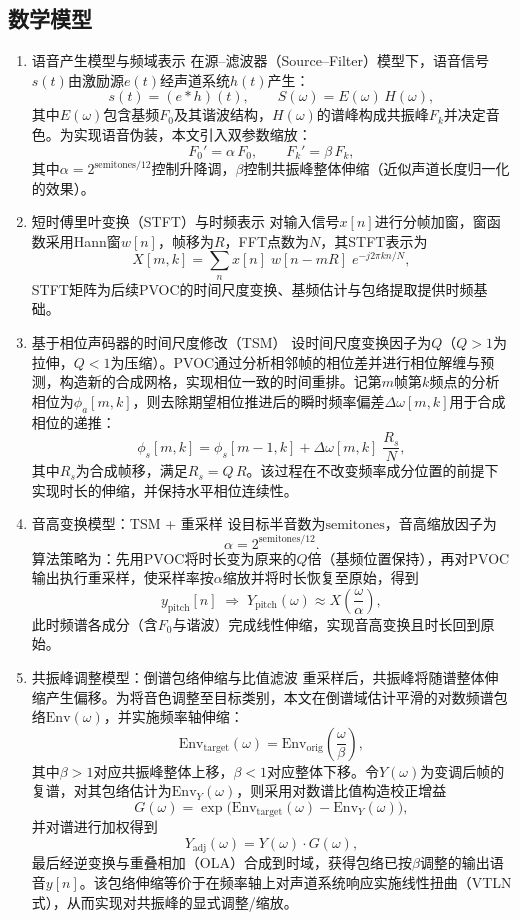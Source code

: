 \documentclass[12pt,a4paper]{article}
\begin{document}
\subsection{数学模型}
\begin{enumerate}[(1)]
 \item 语音产生模型与频域表示
在源–滤波器（Source–Filter）模型下，语音信号$s(t)$由激励源$e(t)$经声道系统$h(t)$产生：
$$s(t)=(e*h)(t),\qquad S(\omega)=E(\omega)\,H(\omega),$$
其中$E(\omega)$包含基频$F_0$及其谐波结构，$H(\omega)$的谱峰构成共振峰$F_k$并决定音色。为实现语音伪装，本文引入双参数缩放：
$$F_0'=\alpha\,F_0,\qquad F_k'=\beta\,F_k,$$
其中$\alpha=2^{\mathrm{semitones}/12}$控制升降调，$\beta$控制共振峰整体伸缩（近似声道长度归一化的效果）。
 \item 短时傅里叶变换（STFT）与时频表示
对输入信号$x[n]$进行分帧加窗，窗函数采用Hann窗$w[n]$，帧移为$R$，FFT点数为$N$，其STFT表示为
$$X[m,k]=\sum_{n}x[n]\;w[n-mR]\;e^{-j2\pi kn/N},$$
STFT矩阵为后续PVOC的时间尺度变换、基频估计与包络提取提供时频基础。
 \item 基于相位声码器的时间尺度修改（TSM）
设时间尺度变换因子为$Q$（$Q>1$为拉伸，$Q<1$为压缩）。PVOC通过分析相邻帧的相位差并进行相位解缠与预测，构造新的合成网格，实现相位一致的时间重排。记第$m$帧第$k$频点的分析相位为$\phi_a[m,k]$，则去除期望相位推进后的瞬时频率偏差$\Delta\omega[m,k]$用于合成相位的递推：
$$\phi_s[m,k]=\phi_s[m-1,k]+\Delta\omega[m,k]\;\frac{R_s}{N},$$
其中$R_s$为合成帧移，满足$R_s=Q\,R$。该过程在不改变频率成分位置的前提下实现时长的伸缩，并保持水平相位连续性。
 \item 音高变换模型：TSM + 重采样
设目标半音数为$\mathrm{semitones}$，音高缩放因子为
$$\alpha=2^{\mathrm{semitones}/12}.$$
算法策略为：先用PVOC将时长变为原来的$Q$倍（基频位置保持），再对PVOC输出执行重采样，使采样率按$\alpha$缩放并将时长恢复至原始，得到
$$y_{\mathrm{pitch}}[n]\;\Rightarrow\;Y_{\mathrm{pitch}}(\omega)\approx X\!\left(\frac{\omega}{\alpha}\right),$$
此时频谱各成分（含$F_0$与谐波）完成线性伸缩，实现音高变换且时长回到原始。
 \item 共振峰调整模型：倒谱包络伸缩与比值滤波
重采样后，共振峰将随谱整体伸缩产生偏移。为将音色调整至目标类别，本文在倒谱域估计平滑的对数频谱包络$\mathrm{Env}(\omega)$，并实施频率轴伸缩：
$$\mathrm{Env}_{\mathrm{target}}(\omega)=\mathrm{Env}_{\mathrm{orig}}\!\left(\frac{\omega}{\beta}\right),$$
其中$\beta>1$对应共振峰整体上移，$\beta<1$对应整体下移。令$Y(\omega)$为变调后帧的复谱，对其包络估计为$\mathrm{Env}_{Y}(\omega)$，则采用对数谱比值构造校正增益
$$G(\omega)=\exp\Big(\mathrm{Env}_{\mathrm{target}}(\omega)-\mathrm{Env}_{Y}(\omega)\Big),$$
并对谱进行加权得到
$$Y_{\mathrm{adj}}(\omega)=Y(\omega)\cdot G(\omega),$$
最后经逆变换与重叠相加（OLA）合成到时域，获得包络已按$\beta$调整的输出语音$y[n]$。该包络伸缩等价于在频率轴上对声道系统响应实施线性扭曲（VTLN式），从而实现对共振峰的显式调整/缩放。
 
\end{enumerate}
\end{document}
